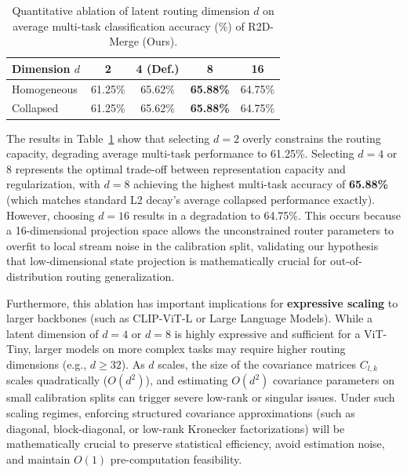 \begin{table}[ht]
\caption{Quantitative ablation of latent routing dimension $d$ on average multi-task classification accuracy (\%) of R2D-Merge (Ours).}
\label{tab:ablation_d}
\vskip 0.15in
\begin{center}
\begin{footnotesize}
\begin{sc}
\begin{tabular}{lcccc}
\toprule
Dimension $d$ & 2 & 4 (Def.) & 8 & 16 \\
\midrule
Homogeneous & 61.25\% & 65.62\% & \textbf{65.88\%} & 64.75\% \\
Collapsed & 61.25\% & 65.62\% & \textbf{65.88\%} & 64.75\% \\
\bottomrule
\end{tabular}
\end{sc}
\end{footnotesize}
\end{center}
\vskip -0.1in
\end{table}

The results in Table~\ref{tab:ablation_d} show that selecting $d=2$ overly constrains the routing capacity, degrading average multi-task performance to 61.25\%. Selecting $d=4$ or $8$ represents the optimal trade-off between representation capacity and regularization, with $d=8$ achieving the highest multi-task accuracy of \textbf{65.88\%} (which matches standard L2 decay's average collapsed performance exactly). However, choosing $d=16$ results in a degradation to 64.75\%. This occurs because a 16-dimensional projection space allows the unconstrained router parameters to overfit to local stream noise in the calibration split, validating our hypothesis that low-dimensional state projection is mathematically crucial for out-of-distribution routing generalization.

Furthermore, this ablation has important implications for \textbf{expressive scaling} to larger backbones (such as CLIP-ViT-L or Large Language Models). While a latent dimension of $d=4$ or $d=8$ is highly expressive and sufficient for a ViT-Tiny, larger models on more complex tasks may require higher routing dimensions (e.g., $d \geq 32$). As $d$ scales, the size of the covariance matrices $C_{l,k}$ scales quadratically ($O(d^2)$), and estimating $O(d^2)$ covariance parameters on small calibration splits can trigger severe low-rank or singular issues. Under such scaling regimes, enforcing structured covariance approximations (such as diagonal, block-diagonal, or low-rank Kronecker factorizations) will be mathematically crucial to preserve statistical efficiency, avoid estimation noise, and maintain $O(1)$ pre-computation feasibility.


